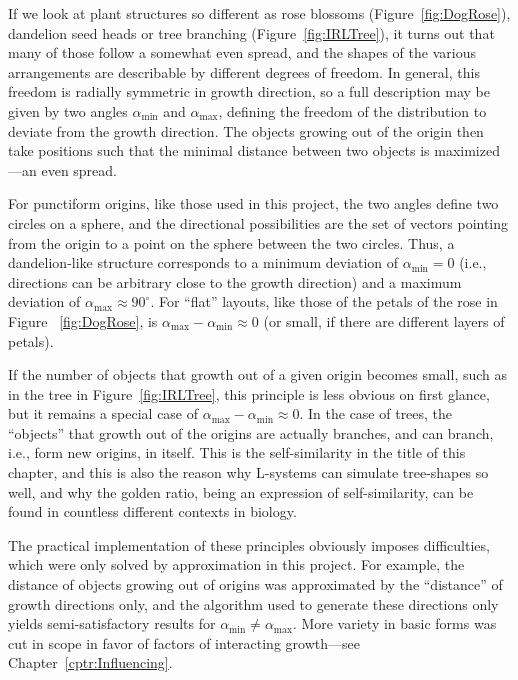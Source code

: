 \documentclass[11pt, abstract=on]{scrartcl}
\begin{document}
If we look at plant structures so different as rose blossoms (Figure~\ref{fig:DogRose}), dandelion seed heads or tree branching (Figure~\ref{fig:IRLTree}), it turns out that many of those follow a somewhat even spread, and the shapes of the various arrangements are describable by different degrees of freedom. In general, this freedom is radially symmetric in growth direction, so a full description may be given by two angles $\alpha_\text{min}$ and $\alpha_\text{max}$, defining the freedom of the distribution to deviate from the growth direction. The objects growing out of the origin then take positions such that the minimal distance between two objects is maximized---an even spread.

For punctiform origins, like those used in this project, the two angles define two circles on a sphere, and the directional possibilities are the set of vectors pointing from the origin to a point on the sphere between the two circles. Thus, a dandelion-like structure corresponds to a minimum deviation of $\alpha_\text{min} = 0$ (i.e., directions can be arbitrary close to the growth direction) and a maximum deviation of 
$\alpha_\text{max} \approx 90^\circ$. For ``flat'' layouts, like those of the petals of the rose in Figure~ \ref{fig:DogRose}, is $\alpha_\text{max} - \alpha_\text{min} \approx 0$ (or small, if there are different layers of petals).

If the number of objects that growth out of a given origin becomes small, such as in the tree in Figure~\ref{fig:IRLTree}, this principle is less obvious on first glance, but it remains a special case of $\alpha_\text{max} - \alpha_\text{min} \approx 0$. In the case of trees, the ``objects'' that growth out of the origins are actually branches, and can branch, i.e., form new origins, in itself. This is the self-similarity in the title of this chapter, and this is also the reason why L-systems can simulate tree-shapes so well, and why the golden ratio, being an expression of self-similarity, can be found in countless different contexts in biology.

The practical implementation of these principles obviously imposes difficulties, which were only solved by approximation in this project. For example, the distance of objects growing out of origins was approximated by the ``distance'' of growth directions only, and the algorithm used to generate these directions only yields semi-satisfactory results for $\alpha_\text{min} \neq \alpha_\text{max}$. More variety in basic forms was cut in scope in favor of factors of interacting growth---see Chapter~\ref{cptr:Influencing}.
\end{document}
